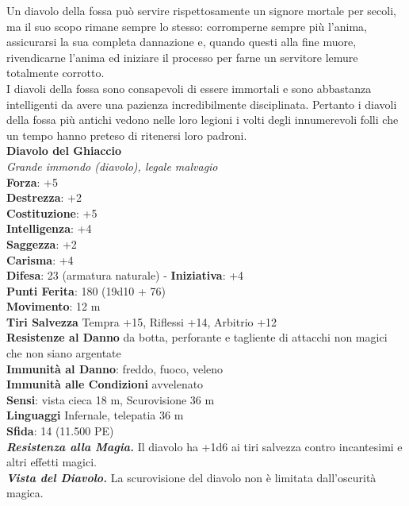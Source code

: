 \begin{multicols}{2}
Un diavolo della fossa può servire rispettosamente un signore mortale per secoli, ma il suo scopo rimane sempre lo stesso: corromperne sempre più l'anima, assicurarsi la sua completa dannazione e, quando questi alla fine muore, rivendicarne l'anima ed iniziare il processo per farne un servitore lemure totalmente corrotto.\\

I diavoli della fossa sono consapevoli di essere immortali e sono abbastanza intelligenti da avere una pazienza incredibilmente disciplinata. Pertanto i diavoli della fossa più antichi vedono nelle loro legioni i volti degli innumerevoli folli che un tempo hanno preteso di ritenersi loro padroni.\\

\medskip\textbf{Diavolo del Ghiaccio}\\
\emph{Grande immondo (diavolo), legale malvagio}\\
\textbf{Forza}: +5\\
\textbf{Destrezza}: +2\\
\textbf{Costituzione}: +5\\
\textbf{Intelligenza}: +4\\
\textbf{Saggezza}: +2\\
\textbf{Carisma}: +4\\
\textbf{Difesa}: 23 (armatura naturale) - \textbf{Iniziativa}: +4\\
\textbf{Punti Ferita}: 180 (19d10 + 76)\\
\textbf{Movimento}: 12 m\\
\textbf{Tiri Salvezza} Tempra +15, Riflessi +14, Arbitrio +12\\
\textbf{Resistenze al Danno} da botta, perforante e tagliente di attacchi non magici che non siano argentate\\
\textbf{Immunità al Danno}: freddo, fuoco, veleno\\
\textbf{Immunità alle Condizioni} avvelenato\\
\textbf{Sensi}: vista cieca 18 m, Scurovisione 36 m\\
\textbf{Linguaggi} Infernale, telepatia 36 m \\
\textbf{Sfida}: 14 (11.500 PE)\smallskip\\
\emph{\textbf{Resistenza alla Magia.}} Il diavolo ha +1d6 ai tiri salvezza contro incantesimi e altri effetti magici.\\
\emph{\textbf{Vista del Diavolo.}} La scurovisione del diavolo non è limitata dall'oscurità magica.\\

\end{multicols}
